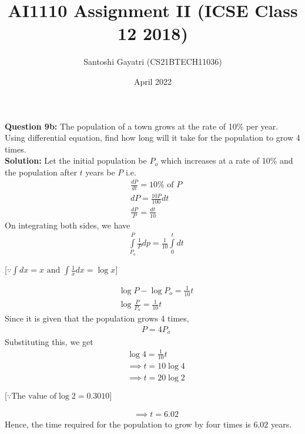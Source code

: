 \documentclass[journal,12pt,twocolumn]{IEEEtran}
\title{AI1110 Assignment II (ICSE Class 12 2018)}
\author{Santoshi Gayatri (CS21BTECH11036)}
\date{April 2022}
\begin{document}
\maketitle
\textbf {Question 9b:}
The population of a town grows at the rate of 10\% per year. Using differential equation, find how long will it take for the population to grow 4 times.\\

\textbf{Solution:}
Let the initial population be $P_o$ which increases at a rate of 10\% and the population after $t$ years be $P$ i.e.
\begin{align}
& {\displaystyle \frac{dP}{dt} = 10\% \mbox{ of } P}\\[6pt]
& {dP =\displaystyle \frac{10P}{100}dt }\\[10pt]
& {\displaystyle \frac{dP}{P} = \frac{dt}{10}}
\end{align}
On integrating both sides, we have 
\begin{align}
& {\displaystyle { \int\limits_{P_o}^{P} \frac{1}{P} dp = \frac {1}{10} \int\limits_{0}^{t}dt}}
\end{align}
\begin{center}
$ \Big [\because \int dx = x  \mbox{ and } \displaystyle{\int\displaystyle \frac{1}{x}dx} = \log x  \Big ] $
\end{center}
\begin{align}
& {\log P - \log P_o = \frac{1}{10}t }\\
&{ \log \frac{P}{P_o} = \frac{1}{10}t }
\end{align}
Since it is given that the population grows 4 times, 
\begin{align}
&{P = 4P_o}
\end{align}
Substituting this, we get
\begin{align}
& {\log 4 =\displaystyle \frac {1}{10}t}\\[8pt]
& {\implies t= 10 \log 4 }\\[8pt]
& {\implies t = 20\log 2 }
\end{align}
\begin{center}
$ \Big[\because \mbox {The value of} \log 2 = 0.3010\Big] $\\
\end{center}
\begin{align}
& {\implies t = 6.02} 
\end{align}
Hence, the time required for the population to grow by four times is \underline{$6.02$} years.
\end{document}
